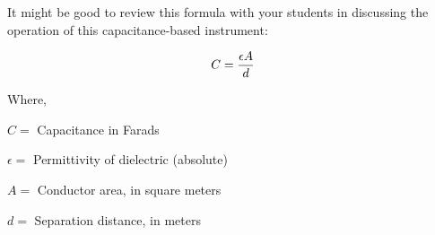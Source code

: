\vskip 10pt

It might be good to review this formula with your students in discussing the operation of this capacitance-based instrument:

$$C = {\epsilon A \over d}$$

\noindent
Where,

$C =$ Capacitance in Farads

$\epsilon =$ Permittivity of dielectric (absolute)

$A =$ Conductor area, in square meters

$d =$ Separation distance, in meters




